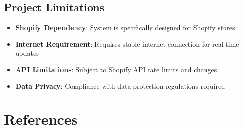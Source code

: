 \documentclass[12pt]{article}
\begin{document}
\subsection{Project Limitations}
\begin{itemize}
    \item \textbf{Shopify Dependency}: System is specifically designed for Shopify stores
    \item \textbf{Internet Requirement}: Requires stable internet connection for real-time updates
    \item \textbf{API Limitations}: Subject to Shopify API rate limits and changes
    \item \textbf{Data Privacy}: Compliance with data protection regulations required
\end{itemize}

\section{References}
\end{document}
